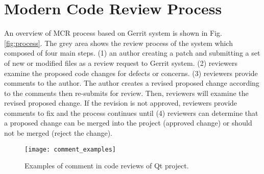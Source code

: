 

\section{Modern Code Review Process}

An overview of MCR process based on Gerrit system is shown in Fig. \ref{fig:process}. The grey area shows the review process of the system which composed of four main steps. (1) an author creating a patch and submitting a set of new or modified files as a review request to Gerrit system. (2) reviewers examine the proposed code changes for defects or concerns. (3) reviewers provide comments to the author. The author creates a revised proposed change according to the comments then re-submits for review. Then, reviewers will examine the revised proposed change. If the revision is not approved, reviewers provide comments to fix and the process continues until (4) reviewers can determine that a proposed change can be merged into the project (approved change) or should not be merged (reject the change). 

\begin{figure}[!t]
\centering
\texttt{[image: comment\_examples]}
\caption{Examples of comment in code reviews of Qt project.}
\label{fig:example}
\end{figure}

